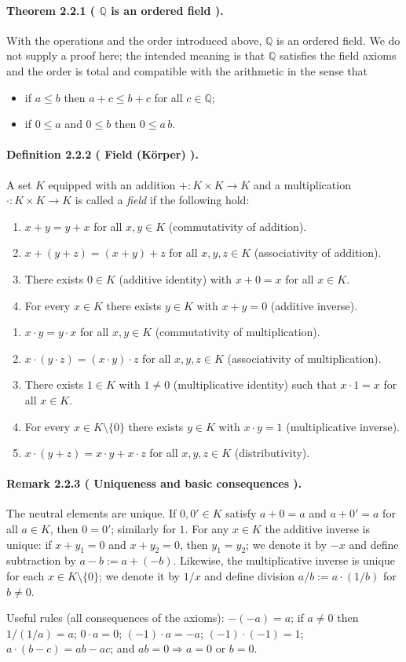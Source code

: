 \documentclass[12pt,a4paper]{article}
\newcommand{\Q}{\mathbb{Q}}
\newcommand{\NumberedDefinition}[3]{%
\paragraph*{Definition #1 ( #2 ).} #3\par}
\newcommand{\NumberedTheorem}[3]{%
\paragraph*{Theorem #1 ( #2 ).} #3\par}
\newcommand{\NumberedRemark}[3]{%
\paragraph*{Remark #1 ( #2 ).} #3\par}
\theoremstyle{plain}
\theoremstyle{definition}
\theoremstyle{remark}
\begin{document}
\NumberedTheorem{2.2.1}{$\Q$ is an ordered field}{With the operations and the order introduced above, $\Q$ is an ordered field. We do not supply a proof here; the intended meaning is that $\Q$ satisfies the field axioms and the order is total and compatible with the arithmetic in the sense that
\begin{itemize}[leftmargin=*]
	\item if $a\le b$ then $a+c\le b+c$ for all $c\in\Q$;
	\item if $0\le a$ and $0\le b$ then $0\le a\,b$.
\end{itemize}}

\NumberedDefinition{2.2.2}{Field (Körper)}{A set $K$ equipped with an addition $+ : K\times K\to K$ and a multiplication $\cdot : K\times K\to K$ is called a \emph{field} if the following hold:
\begin{enumerate}[label={A\arabic*)}, leftmargin=*]
	\item $x+y=y+x$ for all $x,y\in K$ (commutativity of addition).
	\item $x+(y+z)=(x+y)+z$ for all $x,y,z\in K$ (associativity of addition).
	\item There exists $0\in K$ (additive identity) with $x+0=x$ for all $x\in K$.
	\item For every $x\in K$ there exists $y\in K$ with $x+y=0$ (additive inverse).
\end{enumerate}
\begin{enumerate}[label={M\arabic*)}, leftmargin=*]
	\item $x\cdot y = y\cdot x$ for all $x,y\in K$ (commutativity of multiplication).
	\item $x\cdot(y\cdot z)=(x\cdot y)\cdot z$ for all $x,y,z\in K$ (associativity of multiplication).
	\item There exists $1\in K$ with $1\ne 0$ (multiplicative identity) such that $x\cdot 1=x$ for all $x\in K$.
	\item For every $x\in K\setminus\{0\}$ there exists $y\in K$ with $x\cdot y=1$ (multiplicative inverse).
	\item $x\cdot(y+z)=x\cdot y + x\cdot z$ for all $x,y,z\in K$ (distributivity).
\end{enumerate}}

\NumberedRemark{2.2.3}{Uniqueness and basic consequences}{
The neutral elements are unique. If $0,0'\in K$ satisfy $a+0=a$ and $a+0'=a$ for all $a\in K$, then $0=0'$; similarly for $1$. For any $x\in K$ the additive inverse is unique: if $x+y_1=0$ and $x+y_2=0$, then $y_1=y_2$; we denote it by $-x$ and define subtraction by $a-b:=a+(-b)$. Likewise, the multiplicative inverse is unique for each $x\in K\setminus\{0\}$; we denote it by $1/x$ and define division $a/b:=a\cdot(1/b)$ for $b\ne0$.

Useful rules (all consequences of the axioms): $-(-a)=a$; if $a\ne0$ then $1/(1/a)=a$; $0\cdot a=0$; $(-1)\cdot a=-a$; $(-1)\cdot(-1)=1$; $a\cdot(b-c)=ab-ac$; and $ab=0\Rightarrow a=0$ or $b=0$.
}
\end{document}
